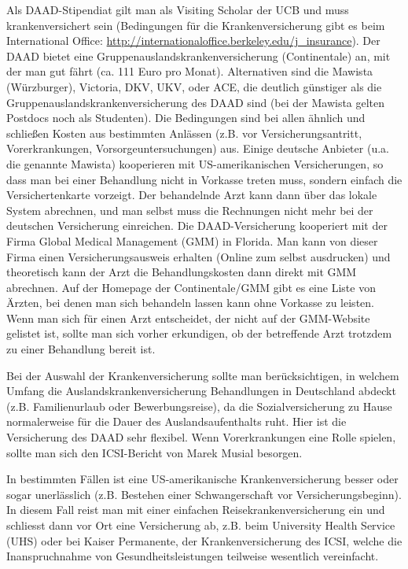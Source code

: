\documentclass[a4paper]{scrreprt}
\begin{document}
Als DAAD-Stipendiat gilt man als Visiting Scholar der UCB und muss krankenversichert sein (Bedingungen für die Krankenversicherung gibt es beim International Office:  \url{http://internationaloffice.berkeley.edu/j\_insurance}). Der DAAD bietet eine Gruppenauslandskrankenversicherung (Continentale) an, mit der man gut fährt (ca. 111 Euro pro Monat). Alternativen sind die Mawista (Würzburger), Victoria, DKV, UKV, oder ACE, die deutlich günstiger als die Gruppenauslandskrankenversicherung des DAAD sind (bei der Mawista gelten Postdocs noch als Studenten). Die Bedingungen sind bei allen ähnlich und schließen Kosten aus bestimmten Anlässen (z.B. vor Versicherungsantritt, Vorerkrankungen, Vorsorgeuntersuchungen) aus. Einige deutsche Anbieter (u.a. die genannte Mawista) kooperieren mit US-amerikanischen Versicherungen, so dass man bei einer Behandlung nicht in Vorkasse treten muss, sondern einfach die Versichertenkarte vorzeigt. Der behandelnde Arzt kann dann über das lokale System abrechnen, und man selbst muss die Rechnungen nicht mehr bei der deutschen Versicherung einreichen. Die DAAD-Versicherung kooperiert mit der Firma Global Medical Management (GMM) in Florida. Man kann von dieser Firma einen Versicherungsausweis erhalten (Online zum selbst ausdrucken) und theoretisch kann der Arzt die Behandlungskosten dann direkt mit GMM abrechnen. Auf der Homepage der Continentale/GMM gibt es eine Liste von Ärzten, bei denen man sich behandeln lassen kann ohne Vorkasse zu leisten.
Wenn man sich für einen Arzt entscheidet, der nicht auf der GMM-Website gelistet ist, sollte man sich vorher erkundigen, ob der betreffende Arzt trotzdem zu einer Behandlung bereit ist.

Bei der Auswahl der Krankenversicherung sollte man berücksichtigen, in welchem Umfang die Auslandskrankenversicherung Behandlungen in Deutschland abdeckt (z.B. Familienurlaub oder Bewerbungsreise), da die Sozialversicherung zu Hause normalerweise für die Dauer des Auslandsaufenthalts ruht. Hier ist die Versicherung des DAAD sehr flexibel. Wenn Vorerkrankungen eine Rolle spielen, sollte man sich den ICSI-Bericht von Marek Musial besorgen.

In bestimmten Fällen ist eine US-amerikanische Krankenversicherung besser oder sogar unerlässlich (z.B. Bestehen einer Schwangerschaft vor Versicherungsbeginn). In diesem Fall reist man mit einer einfachen Reisekrankenversicherung ein und schliesst dann vor Ort eine Versicherung ab, z.B. beim University Health Service (UHS) oder bei Kaiser Permanente, der Krankenversicherung des ICSI, welche die Inanspruchnahme von Gesundheitsleistungen teilweise wesentlich vereinfacht.
\end{document}
